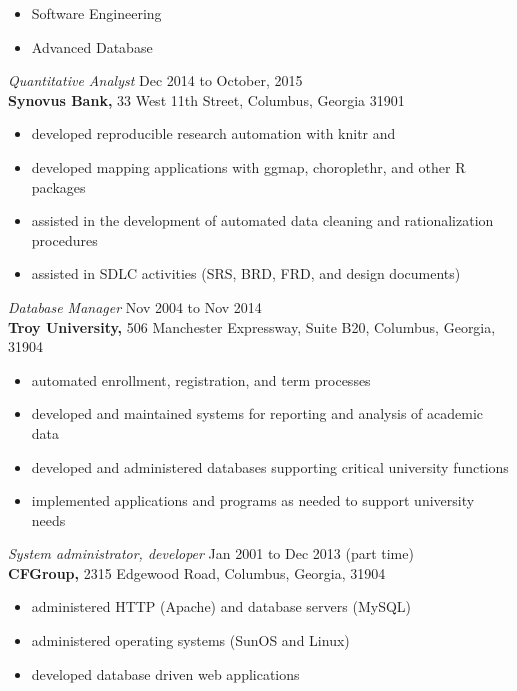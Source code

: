 \documentclass[margin, 10pt]{res} %
\begin{document}
\begin{resume}
\begin{itemize} \itemsep -2pt %
\item Software Engineering
\item Advanced Database
\end{itemize}

{\it Quantitative Analyst} \hfill Dec 2014 to October, 2015 \\
\textbf{Synovus Bank,} 33 West 11th Street, Columbus, Georgia 31901

\begin{itemize} \itemsep -2pt %
\item developed reproducible research automation with knitr and \LaTeXe
\item developed mapping applications with ggmap, choroplethr, and other \textsf{R} packages
\item assisted in the development of automated data cleaning and rationalization procedures
\item assisted in SDLC activities (SRS, BRD, FRD, and design documents)
\end{itemize}
 
{\it Database Manager} \hfill Nov 2004 to Nov 2014 \\
\textbf{Troy University,} 506 Manchester Expressway, Suite B20, Columbus, Georgia, 31904

\begin{itemize} \itemsep -2pt %
\item automated enrollment, registration, and term processes
\item developed and maintained systems for reporting and analysis of academic data
\item developed and administered databases supporting critical university functions 
\item implemented applications and programs as needed to support university needs 
\end{itemize}
 
{\it System administrator, developer} \hfill Jan 2001 to Dec 2013 (part time) \\
\textbf{CFGroup,} 2315 Edgewood Road, Columbus, Georgia, 31904

\begin{itemize} \itemsep -2pt %
\item administered HTTP (Apache) and database servers (MySQL)
\item administered operating systems (SunOS and Linux)
\item developed database driven web applications
\end{itemize}
 

\end{resume}
\end{document}
